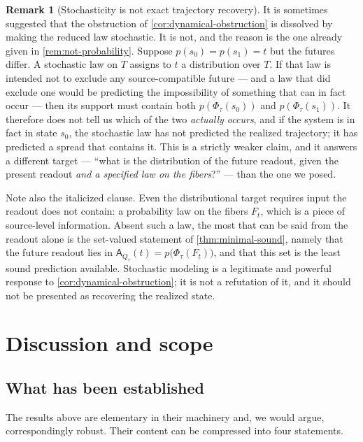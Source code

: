 \documentclass[11pt,reqno]{amsart}
\theoremstyle{plain}
\theoremstyle{definition}
\newtheorem{remark}[theorem]{Remark}
\newcommand{\Rdt}{T}
\newcommand{\CompatSet}{\mathsf{A}}      %
\begin{document}
\begin{remark}[Stochasticity is not exact trajectory recovery]\label{rem:stochastic}
It is sometimes suggested that the obstruction of \cref{cor:dynamical-obstruction} is dissolved by
making the reduced law stochastic. It is not, and the reason is the one already given in
\cref{rem:not-probability}. Suppose $p(s_0)=p(s_1)=t$ but the futures differ. A stochastic law on
$\Rdt$ assigns to $t$ a distribution over $\Rdt$. If that law is intended not to exclude any
source-compatible future --- and a law that did exclude one would be predicting the impossibility
of something that can in fact occur --- then its support must contain both $p(\Phi_\tau(s_0))$ and
$p(\Phi_\tau(s_1))$. It therefore does not tell us which of the two \emph{actually occurs}, and if
the system is in fact in state $s_0$, the stochastic law has not predicted the realized
trajectory; it has predicted a spread that contains it. This is a strictly weaker claim, and it
answers a different target --- ``what is the distribution of the future readout, given the present
readout \emph{and a specified law on the fibers}?'' --- than the one we posed.

Note also the italicized clause. Even the distributional target requires input the readout does not
contain: a probability law on the fibers $F_t$, which is a piece of source-level information. Absent
such a law, the most that can be said from the readout alone is the set-valued statement of
\cref{thm:minimal-sound}, namely that the future readout lies in
$\CompatSet_{Q_\tau}(t)=p\bigl(\Phi_\tau(F_t)\bigr)$, and that this set is the least sound
prediction available. Stochastic modeling is a legitimate and powerful response to
\cref{cor:dynamical-obstruction}; it is not a refutation of it, and it should not be presented as
recovering the realized state.
\end{remark}

\section{Discussion and scope}\label{sec:discussion}

\subsection{What has been established}

The results above are elementary in their machinery and, we would argue, correspondingly robust.
Their content can be compressed into four statements.
\end{document}
